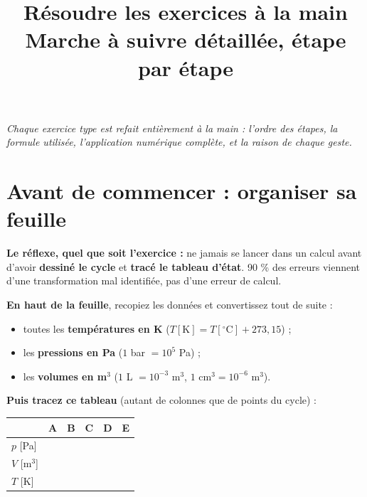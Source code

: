 \documentclass[10.5pt,a4paper]{article}
\title{\textbf{Résoudre les exercices à la main}\\[3pt]
\large Marche à suivre détaillée, étape par étape}
\author{}
\date{}
\newcounter{et}[section]
\begin{document}
\maketitle
\vspace{-0.9cm}
\begin{center}
\small\itshape Chaque exercice type est refait entièrement à la main : l'ordre des étapes, la formule
utilisée, l'application numérique complète, et la raison de chaque geste.
\end{center}
\vspace{0.2cm}
\tableofcontents
\newpage

\section{Avant de commencer : organiser sa feuille}

\begin{reflexe}
\textbf{Le réflexe, quel que soit l'exercice :} ne jamais se lancer dans un calcul avant d'avoir
\textbf{dessiné le cycle} et \textbf{tracé le tableau d'état}. 90 \% des erreurs viennent d'une
transformation mal identifiée, pas d'une erreur de calcul.
\end{reflexe}

\textbf{En haut de la feuille}, recopiez les données et convertissez tout de suite :
\begin{itemize}[leftmargin=1.4em,nosep]
\item toutes les \textbf{températures en K} ($T[\text{K}]=T[^\circ\text{C}]+273{,}15$) ;
\item les \textbf{pressions en Pa} ($1$ bar $=10^5$ Pa) ;
\item les \textbf{volumes en m}$^3$ ($1$ L $=10^{-3}$ m$^3$, $1$ cm$^3=10^{-6}$ m$^3$).
\end{itemize}

\textbf{Puis tracez ce tableau} (autant de colonnes que de points du cycle) :

\begin{center}
\renewcommand{\arraystretch}{1.5}
\begin{tabular}{@{}l|c|c|c|c|c@{}}
\toprule
& \textbf{A} & \textbf{B} & \textbf{C} & \textbf{D} & \textbf{E} \\
\midrule
$p$ [Pa] & & & & & \\
$V$ [m$^3$] & & & & & \\
$T$ [K] & & & & & \\
\bottomrule
\end{tabular}
\end{center}
\end{document}
